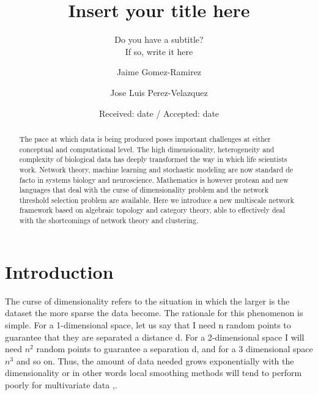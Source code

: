 \documentclass[onecollarge,runningheads]{svjour2}
\begin{document}
\title{Insert your title here%
}
\subtitle{Do you have a subtitle?\\ If so, write it here}
\author{Jaime Gomez-Ramirez        \and
        Jose Luis Perez-Velazquez %
}
\date{Received: date / Accepted: date}
\maketitle

\begin{abstract}
The pace at which data is being produced poses important challenges at either conceptual and computational level. The high dimensionality, heterogeneity and complexity of biological data has deeply transformed the way in which life scientists work. Network theory, machine learning and stochastic modeling are now standard de facto in systems biology and neuroscience. Mathematics is however protean and new languages that deal with the curse of dimensionality problem and the network threshold selection problem are available. Here we introduce a new multiscale network framework based on algebraic topology and category theory, able to effectively deal with the shortcomings of network theory and clustering.

\end{abstract}


\section*{Introduction}
The curse of dimensionality refers to the situation in which the larger is the dataset the more sparse the data become. The rationale for this phenomenon is simple. For a 1-dimensional space, let us say that I need n random points to guarantee that they are separated a distance d. For a 2-dimensional space I will need $n^2$ random points to guarantee a separation d, and for a 3 dimensional space $n^3$ and so on. Thus, the amount of data needed grows exponentially with the dimensionality or in other words local smoothing methods will tend to perform poorly for multivariate data \citep{stone1982optimal} ,\citep{lavergne2008breaking}.  
\end{document}
